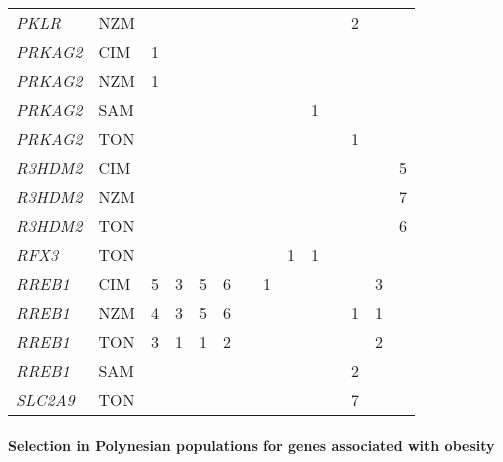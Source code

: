 \documentclass[twoside,openright]{report}
\let\oldparagraph\paragraph
\renewcommand{\paragraph}[1]{\oldparagraph{#1}\mbox{}}
\begin{document}
\begin{ThreePartTable}
\begin{longtable}[t]{llllllllllllll}
\em{PKLR} & NZM &  &  &  &  &  &  &  &  &  & 2 &  & \\
\em{PRKAG2} & CIM & 1 &  &  &  &  &  &  &  &  &  &  & \\
\em{PRKAG2} & NZM & 1 &  &  &  &  &  &  &  &  &  &  & \\
\em{PRKAG2} & SAM &  &  &  &  &  &  &  & 1 &  &  &  & \\
\em{PRKAG2} & TON &  &  &  &  &  &  &  &  &  & 1 &  & \\
\em{R3HDM2} & CIM &  &  &  &  &  &  &  &  &  &  &  & 5\\
\em{R3HDM2} & NZM &  &  &  &  &  &  &  &  &  &  &  & 7\\
\em{R3HDM2} & TON &  &  &  &  &  &  &  &  &  &  &  & 6\\
\em{RFX3} & TON &  &  &  &  &  &  & 1 & 1 &  &  &  & \\
\em{RREB1} & CIM & 5 & 3 & 5 & 6 &  & 1 &  &  &  &  & 3 & \\
\em{RREB1} & NZM & 4 & 3 & 5 & 6 &  &  &  &  &  & 1 & 1 & \\
\em{RREB1} & TON & 3 & 1 & 1 & 2 &  &  &  &  &  &  & 2 & \\
\em{RREB1} & SAM &  &  &  &  &  &  &  &  &  & 2 &  & \\
\em{SLC2A9} & TON &  &  &  &  &  &  &  &  &  & 7 &  & \\*
\end{longtable}
\end{ThreePartTable}

\endgroup{}

\paragraph{Selection in Polynesian populations for genes associated with
obesity}\label{selection-in-polynesian-populations-for-genes-associated-with-obesity}
\end{document}
